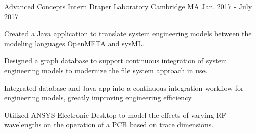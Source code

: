\begin{cventries}
  \cventry
    {Advanced Concepts Intern} %
    {Draper Laboratory} %
    {Cambridge MA} %
    {Jan. 2017 - July 2017} %
    {
      \begin{cvitems} %
        \item {Created a Java application to translate system engineering models between the modeling languages OpenMETA and sysML.}
        \item {Designed a graph database to support continuous integration of system engineering models to modernize the file system approach in use.}
        \item {Integrated database and Java app into a continuous integration workflow for engineering models, greatly improving engineering efficiency.}
        \item {Utilized ANSYS Electronic Desktop to model the effects of varying RF wavelengths on the operation of a PCB based on trace dimensions.}
      \end{cvitems}
    }

\end{cventries}
